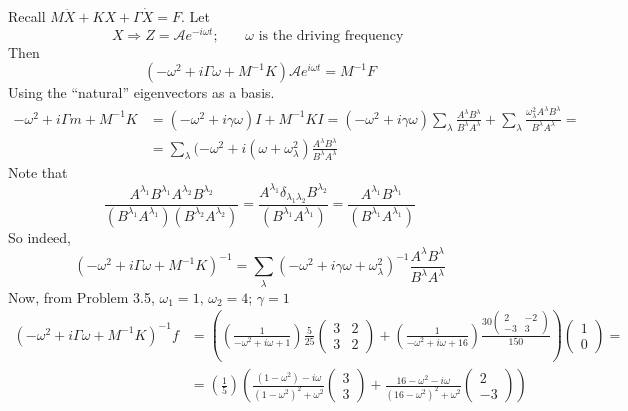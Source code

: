 \documentclass[twoside,10pt]{amsart}
\newcommand{\problemhead}[1]
  {\smallskip
   \noindent{\large\bf Problem #1.}
   \smallskip}
\begin{document}
\problemhead{3.7} Recall $M \ddot{X} + K X + \Gamma \dot{X} = F$.  Let
\[
X \Longrightarrow Z = \mathcal{A} e^{- i \omega t}; \quad \, \text{ $\omega$ is the driving frequency }
\]
Then 
\[
( - \omega^2 + i \Gamma \omega + M^{-1} K ) \mathcal{A} e^{i\omega t} = M^{-1} F
\]
Using the ``natural'' eigenvectors as a basis.  
\[
\begin{aligned}
  -\omega^2 + i \Gamma m + M^{-1} K & = (-\omega^2 + i \gamma \omega) I + M^{-1} K I = (-\omega^2 + i \gamma \omega) \sum_{\lambda} \frac{ A^{\lambda} B^{\lambda} }{ B^{\lambda} A^{\lambda} } + \sum_{\lambda} \frac{ \omega_{\lambda}^2 A^{\lambda} B^{\lambda} }{ B^{\lambda} A^{\lambda} } = \\ & = \sum_{\lambda} (-\omega^2 + i (\omega + \omega_{\lambda}^2 ) \frac{ A^{\lambda} B^{\lambda} }{ B^{\lambda} A^{\lambda} }
\end{aligned}
\]
Note that \[
\frac{ A^{\lambda_1} B^{\lambda_1} A^{\lambda_2} B^{\lambda_2} }{ (B^{\lambda_1} A^{\lambda_1} )( B^{\lambda_2} A^{\lambda_2}  )} = \frac{ A^{\lambda_1} \delta_{\lambda_1 \lambda_2} B^{\lambda_2}  }{ (B^{\lambda_1} A^{\lambda_1} )} = \frac{ A^{\lambda_1 } B^{\lambda_1} }{ (B^{\lambda_1} A^{\lambda_1} ) }
\]
So indeed, 
\[
(-\omega^2 + i \Gamma \omega + M^{-1} K )^{-1} = \sum_{\lambda} ( - \omega^2 +i \gamma \omega + \omega_{\lambda}^2 )^{-1} \frac{ A^{\lambda} B^{\lambda} }{ B^{\lambda} A^{\lambda} } \]
Now, from Problem 3.5, $\omega_1 = 1, \, \omega_2 =4$; $\gamma =1$
\[
\begin{aligned}
  (-\omega^2 + i \Gamma \omega + M^{-1} K)^{-1} f &= \left( \left( \frac{1}{ -\omega^2 + i \omega + 1 } \right) \frac{5}{25} \left( \begin{matrix} 3 & 2 \\ 3 & 2 \end{matrix} \right) + \left( \frac{ 1}{ -\omega^2 + i \omega + 16 } \right) \frac{ 30 \left( \begin{matrix} 2 & -2 \\ -3 & 3 \end{matrix} \right) }{ 150 } \right) \left( \begin{matrix} 1 \\ 0 \end{matrix} \right) = \\ 
  & = \left( \frac{1}{5} \right) \left( \frac{ ( 1 - \omega^2 ) - i \omega }{ (1-\omega^2)^2 + \omega^2 } \left( \begin{matrix} 3 \\ 3 \end{matrix} \right) + \frac{ 16 - \omega^2 - i \omega }{ (16- \omega^2)^2 + \omega^2 } \left( \begin{matrix} 2 \\ -3 \end{matrix} \right) \right)
\end{aligned}
\]
\end{document}
